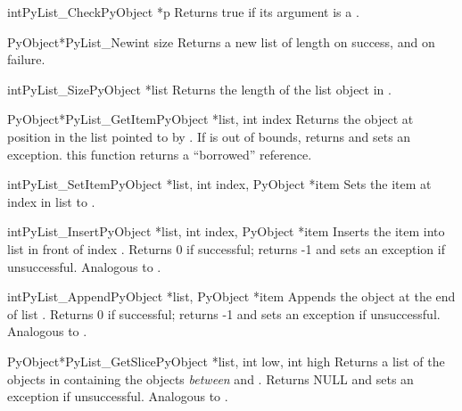 \documentclass{manual}
\begin{document}
\begin{cfuncdesc}{int}{PyList_Check}{PyObject *p}
Returns true if its argument is a .
\end{cfuncdesc}

\begin{cfuncdesc}{PyObject*}{PyList_New}{int size}
Returns a new list of length  on success, and \NULL{} on
failure.
\end{cfuncdesc}

\begin{cfuncdesc}{int}{PyList_Size}{PyObject *list}
Returns the length of the list object in .
\end{cfuncdesc}

\begin{cfuncdesc}{PyObject*}{PyList_GetItem}{PyObject *list, int index}
Returns the object at position  in the list pointed
to by .  If  is out of bounds, returns \NULL{} and
sets an  exception.   this
function returns a ``borrowed'' reference.
\end{cfuncdesc}

\begin{cfuncdesc}{int}{PyList_SetItem}{PyObject *list, int index,
                                       PyObject *item}
Sets the item at index  in list to .
\end{cfuncdesc}

\begin{cfuncdesc}{int}{PyList_Insert}{PyObject *list, int index,
                                      PyObject *item}
Inserts the item  into list  in front of index
.  Returns 0 if successful; returns -1 and sets an
exception if unsuccessful.  Analogous to .
\end{cfuncdesc}

\begin{cfuncdesc}{int}{PyList_Append}{PyObject *list, PyObject *item}
Appends the object  at the end of list .  Returns
0 if successful; returns -1 and sets an exception if unsuccessful.
Analogous to .
\end{cfuncdesc}

\begin{cfuncdesc}{PyObject*}{PyList_GetSlice}{PyObject *list,
                                              int low, int high}
Returns a list of the objects in  containing the objects 
\emph{between}  and .  Returns NULL and sets an
exception if unsuccessful.
Analogous to .
\end{cfuncdesc}
\end{document}
